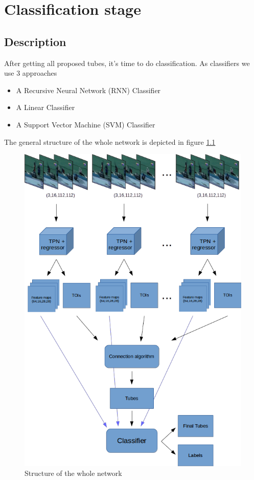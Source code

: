 \documentclass{report}
\begin{document}
\chapter{Classification stage}
\section{Description}
After getting all proposed tubes, it's time to do classification. As classifiers we use 3 approaches
\begin{itemize}
\item  A Recursive Neural Network (RNN) Classifier
\item  A Linear Classifier
\item  A Support Vector Machine (SVM) Classifier
\end{itemize}

The general structure of the whole network is depicted in figure \ref{fig:whole_network}

\begin{figure}[h]
  \centering
  \includegraphics[scale=0.7]{model}
  \caption{Structure of the whole network}
  \label{fig:whole_network}
\end{figure}
\end{document}
